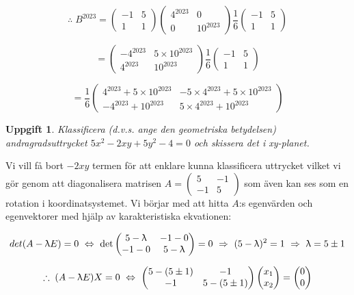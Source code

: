 \documentclass{article}
\newtheorem{thr}{Uppgift}
\begin{document}
$$
\therefore
\;
B^{2023}=
\begin{pmatrix}
    -1 & 5 \\
    1 & 1
\end{pmatrix}
\begin{pmatrix}
    4^{2023} & 0 \\
    0 & 10^{2023} 
\end{pmatrix}
\frac{1}{6}
\begin{pmatrix}
    -1 & 5 \\
    1 & 1
\end{pmatrix}
$$

$$
=
\begin{pmatrix}
    -4^{2023} & 5 \times 10^{2023} \\
    4^{2023} & 10^{2023}
\end{pmatrix}
\frac{1}{6}
\begin{pmatrix}
    -1 & 5 \\
    1 & 1
\end{pmatrix}
$$

$$
=
\frac{1}{6}
\begin{pmatrix}
    4^{2023}+5 \times 10^{2023} & -5 \times 4^{2023}+5 \times 10^{2023} \\
    -4^{2023}+10^{2023} & 5 \times 4^{2023}+10^{2023}
\end{pmatrix}
$$

\newpage

\begin{thr}
Klassificera (d.v.s. ange den geometriska betydelsen) andragradsuttrycket $5x^2-2xy+5y^2-4=0$ och skissera det i xy-planet.
\end{thr}

Vi vill få bort $-2xy$ termen för att enklare kunna klassificera uttrycket vilket vi gör genom att diagonalisera matrisen $A=\begin{pmatrix} 5 & -1 \\ -1 & 5 \end{pmatrix}$ som även kan ses som en rotation i koordinatsystemet. Vi börjar med att hitta $A$:s egenvärden och egenvektorer med hjälp av karakteristiska ekvationen:

$$
det(A-\uplambda E)=0 
\ \Leftrightarrow \  
\det\begin{pmatrix}
    5-\uplambda & -1-0 \\
    -1-0 & 5-\uplambda 
\end{pmatrix}
=0
\ \Rightarrow \ 
(5-\uplambda)^2=1
\ \Rightarrow \ 
\uplambda=5\pm1
$$

$$
\therefore
\;
(A-\uplambda E)X=0 
\ \Leftrightarrow \ 
\begin{pmatrix}
    5-(5\pm1) & -1 \\
    -1 & 5-(5\pm1)
\end{pmatrix}
\begin{pmatrix}
    x_{1} \\
    x_{2}
\end{pmatrix}
=
\begin{pmatrix}
    0 \\
    0
\end{pmatrix}
$$
\end{document}
